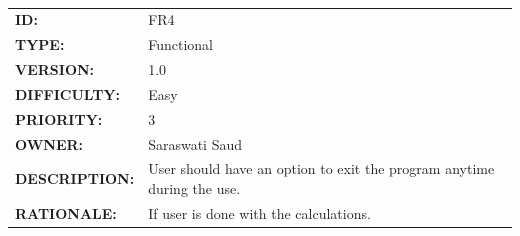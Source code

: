 \documentclass[a4paper,12pt]{article}
\begin{document}
        \\[10pt]
        \begin{tabular}{ |p{4cm} | p{11cm}| }
            \hline
            \textbf{ID:} & FR4\\
            \textbf{TYPE:} & Functional\\
            \textbf{VERSION:} & 1.0\\
            \textbf{DIFFICULTY:} & Easy\\
            \textbf{PRIORITY:} & 3\\
            \textbf{OWNER:} & Saraswati Saud\\
            \textbf{DESCRIPTION:} & User should have an option to exit the program anytime during the use. \\
            \textbf{RATIONALE:} & If user is done with the calculations. \\
            \hline
        \end{tabular}
\end{document}
